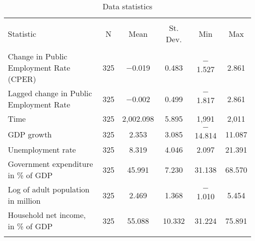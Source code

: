 
\begin{table}[!htbp] \centering 
  \caption{Data statistics} 
  \label{} 
\footnotesize 
\begin{tabular}{@{\extracolsep{5pt}}lccccc} 
\\[-1.8ex]\hline 
\hline \\[-1.8ex] 
Statistic & \multicolumn{1}{c}{N} & \multicolumn{1}{c}{Mean} & \multicolumn{1}{c}{St. Dev.} & \multicolumn{1}{c}{Min} & \multicolumn{1}{c}{Max} \\ 
\hline \\[-1.8ex] 
Change in Public Employment Rate (CPER) & 325 & $-$0.019 & 0.483 & $-$1.527 & 2.861 \\ 
Lagged change in Public Employment Rate & 325 & $-$0.002 & 0.499 & $-$1.817 & 2.861 \\ 
Time & 325 & 2,002.098 & 5.895 & 1,991 & 2,011 \\ 
GDP growth & 325 & 2.353 & 3.085 & $-$14.814 & 11.087 \\ 
Unemployment rate & 325 & 8.319 & 4.046 & 2.097 & 21.391 \\ 
Government expenditure in \% of GDP & 325 & 45.991 & 7.230 & 31.138 & 68.570 \\ 
Log of adult population in million & 325 & 2.469 & 1.368 & $-$1.010 & 5.454 \\ 
Household net income, in \% of GDP & 325 & 55.088 & 10.332 & 31.224 & 75.891 \\ 
\hline \\[-1.8ex] 
\end{tabular} 
\end{table} 
